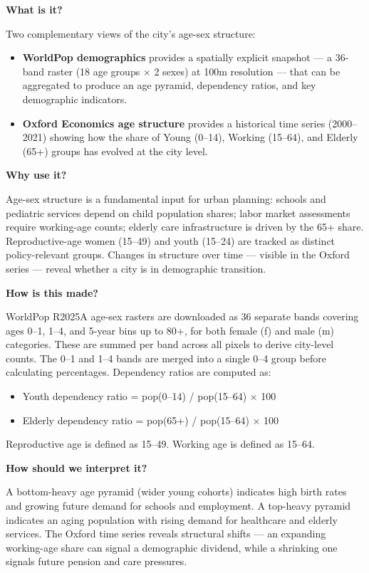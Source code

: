\documentclass[
  letterpaper,
  DIV=11,
  numbers=noendperiod]{scrreprt}
\providecommand{\tightlist}{%
  \setlength{\itemsep}{0pt}\setlength{\parskip}{0pt}}
\begin{document}
\textbf{What is it?}

Two complementary views of the city's age-sex structure:

\begin{itemize}
\tightlist
\item
  \textbf{WorldPop demographics} provides a spatially explicit snapshot
  --- a 36-band raster (18 age groups × 2 sexes) at 100m resolution ---
  that can be aggregated to produce an age pyramid, dependency ratios,
  and key demographic indicators.
\item
  \textbf{Oxford Economics age structure} provides a historical time
  series (2000--2021) showing how the share of Young (0--14), Working
  (15--64), and Elderly (65+) groups has evolved at the city level.
\end{itemize}

\textbf{Why use it?}

Age-sex structure is a fundamental input for urban planning: schools and
pediatric services depend on child population shares; labor market
assessments require working-age counts; elderly care infrastructure is
driven by the 65+ share. Reproductive-age women (15--49) and youth
(15--24) are tracked as distinct policy-relevant groups. Changes in
structure over time --- visible in the Oxford series --- reveal whether
a city is in demographic transition.

\textbf{How is this made?}

WorldPop R2025A age-sex rasters are downloaded as 36 separate bands
covering ages 0--1, 1--4, and 5-year bins up to 80+, for both female (f)
and male (m) categories. These are summed per band across all pixels to
derive city-level counts. The 0--1 and 1--4 bands are merged into a
single 0--4 group before calculating percentages. Dependency ratios are
computed as:

\begin{itemize}
\tightlist
\item
  Youth dependency ratio = pop(0--14) / pop(15--64) × 100
\item
  Elderly dependency ratio = pop(65+) / pop(15--64) × 100
\end{itemize}

Reproductive age is defined as 15--49. Working age is defined as 15--64.

\textbf{How should we interpret it?}

A bottom-heavy age pyramid (wider young cohorts) indicates high birth
rates and growing future demand for schools and employment. A top-heavy
pyramid indicates an aging population with rising demand for healthcare
and elderly services. The Oxford time series reveals structural shifts
--- an expanding working-age share can signal a demographic dividend,
while a shrinking one signals future pension and care pressures.
\end{document}
